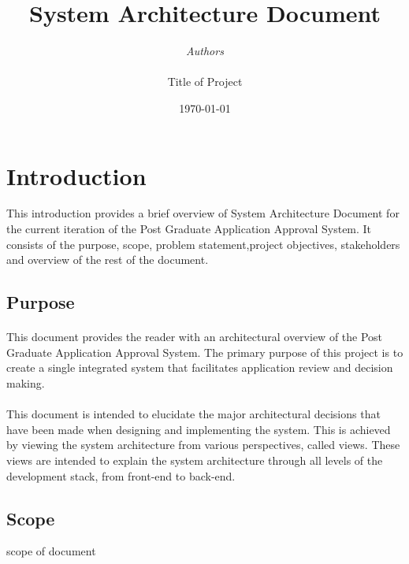 \documentclass[11pt]{article}
\begin{document}

\thispagestyle{empty}
\title{{\LARGE\bf System Architecture Document}}
\author{{\Large\it Authors} \\
\vspace*{2.5in} 
\mbox{} \\
{\Large Title of Project}
\vspace*{2.5in} 
\mbox{} \\
\date{\today}
}
\maketitle

\tableofcontents

%

\section{Introduction}
This introduction provides a brief overview of System Architecture Document for the current iteration of the Post Graduate Application Approval System. It consists of the purpose, scope, problem statement,project objectives, stakeholders and overview of the rest of the document.
\subsection{Purpose}
\paragraph{}This document provides the reader with an architectural overview of the Post Graduate Application Approval System. The primary purpose of this project is to create a single integrated system that facilitates application review and decision making.

\paragraph{}This document is intended to elucidate the major architectural decisions that have been made when designing and implementing the system. This is achieved by viewing the system architecture from various perspectives, called views. These views are intended to explain the system architecture through all levels of the development stack, from front-end to back-end.


\subsection{Scope}
scope of document
\end{document}

